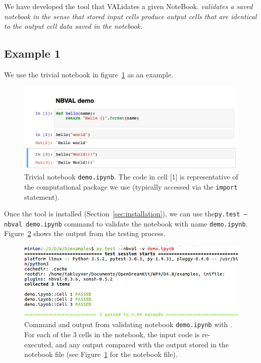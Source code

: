 \documentclass{deliverablereport}
\begin{document}
We have developed the \nbval tool that VALidates a given
NoteBook. \emph{\nbval validates a saved notebook in the sense that stored
input cells produce output cells that are identical to the output cell
data saved in the notebook.}

\subsection{Example 1}
We use the trivial notebook in figure~\ref{fig:demo-ipynb} as an
example.

\begin{figure}[ht]
  \centering
  \includegraphics[width=1\textwidth]{examples/demo.png}
  \caption{Trivial notebook \texttt{demo.ipynb}. The code in cell [1] is
    representative of the computational package we use (typically
    accessed via the \texttt{import} statement).\label{fig:demo-ipynb}}
\end{figure}

Once the \nbval tool is installed (Section~\ref{sec:installation}), we
can use the\linebreak \texttt{py.test --nbval demo.ipynb} command to
validate the notebook with name
\texttt{demo.ipynb}. Figure~\ref{fig:demo-pytest} shows the output
from the testing process.

\begin{figure}[ht]
  \centering
  \includegraphics[width=1\textwidth]{examples/demo-pytest.png}
  \caption{\nbval Command and output from validating notebook
    \texttt{demo.ipynb} with \nbval. For each of the 3 cells in the notebook,
    the input code is re-executed, and any output compared with the
    output stored in the notebook file (see
    Figure~\ref{fig:demo-ipynb} for the notebook file).\label{fig:demo-pytest}}
\end{figure}
\end{document}
